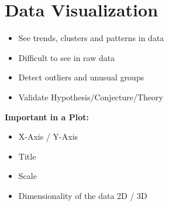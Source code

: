 \section{Data Visualization}
\begin{itemize}
    \item See trends, clusters and patterns in data
    \item Difficult to see in raw data
    \item Detect outliers and unusual groups
    \item Validate Hypothesis/Conjecture/Theory
\end{itemize}
\textbf{Important in a Plot:}
\begin{itemize}
    \item X-Axis / Y-Axis
    \item Title
    \item Scale
    \item Dimensionality of the data 2D / 3D
\end{itemize}

